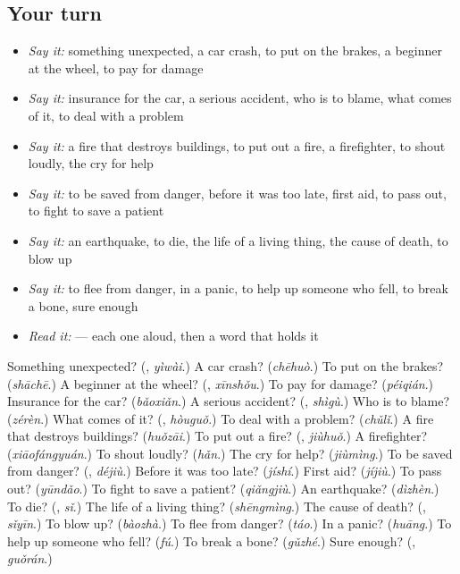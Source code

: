 \subsection*{Your turn}
\begin{itemize}
\raggedright
  \item \emph{Say it:} something unexpected, a car crash, to put on the brakes, a beginner at the wheel, to pay for damage
  \item \emph{Say it:} insurance for the car, a serious accident, who is to blame, what comes of it, to deal with a problem
  \item \emph{Say it:} a fire that destroys buildings, to put out a fire, a firefighter, to shout loudly, the cry for help
  \item \emph{Say it:} to be saved from danger, before it was too late, first aid, to pass out, to fight to save a patient
  \item \emph{Say it:} an earthquake, to die, the life of a living thing, the cause of death, to blow up
  \item \emph{Say it:} to flee from danger, in a panic, to help up someone who fell, to break a bone, sure enough
  \item \emph{Read it:}    — each one aloud, then a word that holds it
\end{itemize}

\begin{tcolorbox}[breakable,colback=teal!4,colframe=teal!35!black,title={Before you move on}]
Something unexpected? (\textbf{}, \emph{yìwài}.) A car crash? (\emph{chēhuò}.) To put on the brakes? (\emph{shāchē}.) A beginner at the wheel? (\textbf{}, \emph{xīnshǒu}.) To pay for damage? (\emph{péiqián}.) Insurance for the car? (\emph{bǎoxiǎn}.) A serious accident? (\textbf{}, \emph{shìgù}.) Who is to blame? (\emph{zérèn}.) What comes of it? (\textbf{}, \emph{hòuguǒ}.) To deal with a problem? (\emph{chǔlǐ}.) A fire that destroys buildings? (\emph{huǒzāi}.) To put out a fire? (\textbf{}, \emph{jiùhuǒ}.) A firefighter? (\emph{xiāofángyuán}.) To shout loudly? (\emph{hǎn}.) The cry for help? (\emph{jiùmìng}.) To be saved from danger? (\textbf{}, \emph{déjiù}.) Before it was too late? (\emph{jíshí}.) First aid? (\emph{jíjiù}.) To pass out? (\emph{yūndǎo}.) To fight to save a patient? (\emph{qiǎngjiù}.) An earthquake? (\emph{dìzhèn}.) To die? (\textbf{}, \emph{sǐ}.) The life of a living thing? (\emph{shēngmìng}.) The cause of death? (\textbf{}, \emph{sǐyīn}.) To blow up? (\emph{bàozhà}.) To flee from danger? (\emph{táo}.) In a panic? (\emph{huāng}.) To help up someone who fell? (\emph{fú}.) To break a bone? (\emph{gǔzhé}.) Sure enough? (\textbf{}, \emph{guǒrán}.)
\end{tcolorbox}
